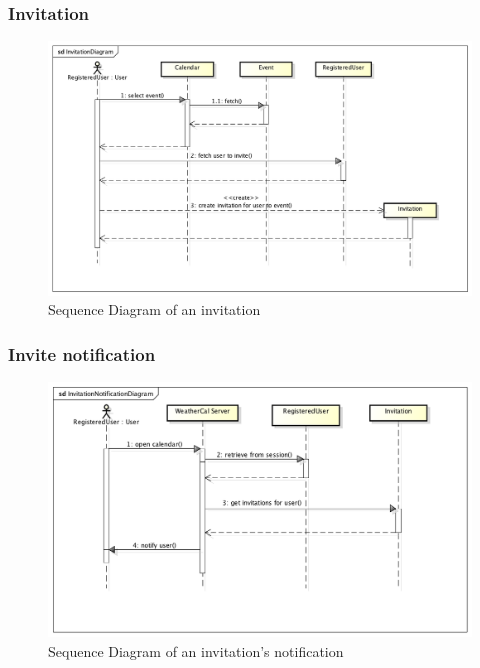 \subsubsection{Invitation}
\begin{center}
 \begin{figure}[H]
    \includegraphics[width=1\textwidth]{../UMLDiagram/sequence/InvitationDiagram/InvitationDiagram.png}
    \caption{Sequence Diagram of an invitation}
     \label{fig:invitseqdiag}
     \end{figure}
   \end{center}  
\subsubsection{Invite notification}
\begin{center}
 \begin{figure}[H]
    \includegraphics[width=1\textwidth]{../UMLDiagram/sequence/InvitationNotificationDiagram/InvitationNotificationDiagram.png}
    \caption{Sequence Diagram of an invitation's notification}
     \label{fig:notseqdiagr}
     \end{figure}
   \end{center}  
